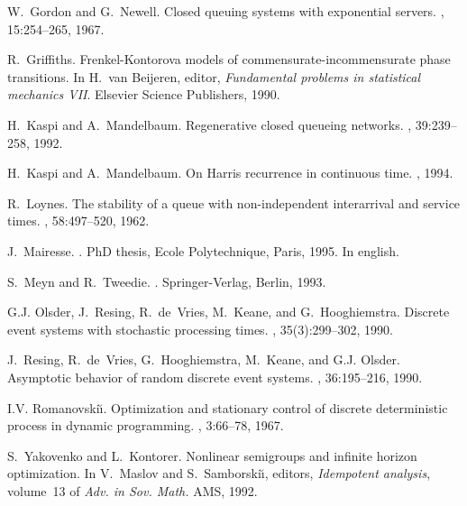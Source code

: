 \documentclass[11pt,titlepage]{article}
\begin{document}
\begin{thebibliography}{10}
W.~Gordon and G.~Newell.
\newblock Closed queuing systems with exponential servers.
, 15:254--265, 1967.

R.~Griffiths.
\newblock Frenkel-{K}ontorova models of commensurate-incommensurate phase
  transitions.
\newblock In H.~van Beijeren, editor, {\em Fundamental problems in statistical
  mechanics VII}. Elsevier Science Publishers, 1990.

H.~Kaspi and A.~Mandelbaum.
\newblock Regenerative closed queueing networks.
, 39:239--258, 1992.

H.~Kaspi and A.~Mandelbaum.
\newblock On {H}arris recurrence in continuous time.
, 1994.

R.~Loynes.
\newblock The stability of a queue with non-independent interarrival and
  service times.
, 58:497--520, 1962.

J.~Mairesse.
.
\newblock PhD thesis, Ecole Polytechnique, Paris, 1995.
\newblock In english.

S.~Meyn and R.~Tweedie.
.
\newblock Springer-Verlag, Berlin, 1993.

G.J. Olsder, J.~Resing, R.~de~Vries, M.~Keane, and G.~Hooghiemstra.
\newblock Discrete event systems with stochastic processing times.
, 35(3):299--302, 1990.

J.~Resing, R.~de~Vries, G.~Hooghiemstra, M.~Keane, and G.J. Olsder.
\newblock Asymptotic behavior of random discrete event systems.
, 36:195--216, 1990.

I.V. Romanovski\u\i.
\newblock Optimization and stationary control of discrete deterministic process
  in dynamic programming.
, 3:66--78, 1967.

S.~Yakovenko and L.~Kontorer.
\newblock Nonlinear semigroups and infinite horizon optimization.
\newblock In V.~Maslov and S.~Samborski\u\i, editors, {\em Idempotent
  analysis}, volume~13 of {\em Adv. in Sov. Math.} AMS, 1992.

\end{thebibliography}
\end{document}
